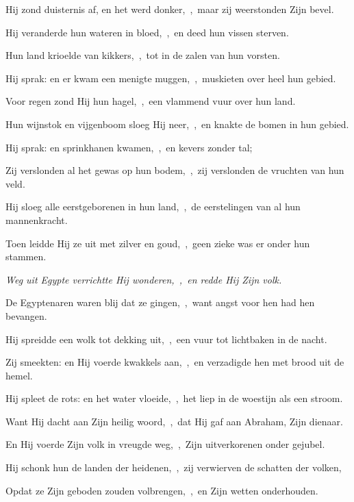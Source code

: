 \documentclass[12pt,twoside,a5paper]{article}
\begin{document}
\begin{halfparskip}
  Hij zond duisternis af, en het werd donker,~\sep\ maar zij weerstonden Zijn bevel.

  Hij veranderde hun wateren in bloed,~\sep\ en deed hun vissen sterven.

  Hun land krioelde van kikkers,~\sep\ tot in de zalen van hun vorsten.

  Hij sprak: en er kwam een menigte muggen,~\sep\ muskieten over heel hun gebied.

  Voor regen zond Hij hun hagel,~\sep\ een vlammend vuur over hun land.

  Hun wijnstok en vijgenboom sloeg Hij neer,~\sep\ en knakte de bomen in hun gebied.

  Hij sprak: en sprinkhanen kwamen,~\sep\ en kevers zonder tal;

  Zij verslonden al het gewas op hun bodem,~\sep\ zij verslonden de vruchten van hun veld.

  Hij sloeg alle eerstgeborenen in hun land,~\sep\ de eerstelingen van al hun mannenkracht.

  Toen leidde Hij ze uit met zilver en goud,~\sep\ geen zieke was er onder hun stammen.

  \emph{Weg uit Egypte verrichtte Hij wonderen,~\sep\ en redde Hij Zijn volk.}

  De Egyptenaren waren blij dat ze gingen,~\sep\ want angst voor hen had hen bevangen.
\end{halfparskip}


\begin{halfparskip}
  Hij spreidde een wolk tot dekking uit,~\sep\ een vuur tot lichtbaken in de nacht.

  Zij smeekten: en Hij voerde kwakkels aan,~\sep\ en verzadigde hen met brood uit de hemel.

  Hij spleet de rots: en het water vloeide,~\sep\ het liep in de woestijn als een stroom.

  Want Hij dacht aan Zijn heilig woord,~\sep\ dat Hij gaf aan Abraham, Zijn dienaar.

  En Hij voerde Zijn volk in vreugde weg,~\sep\ Zijn uitverkorenen onder gejubel.
\end{halfparskip}


\begin{halfparskip}
  Hij schonk hun de landen der heidenen,~\sep\ zij verwierven de schatten der volken,

  Opdat ze Zijn geboden zouden volbrengen,~\sep\ en Zijn wetten onderhouden.
\end{halfparskip}
\end{document}
